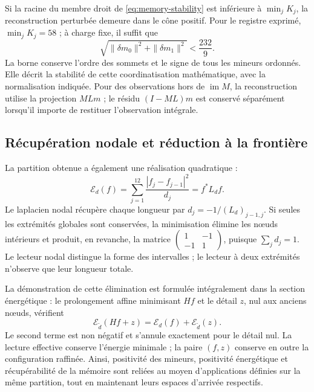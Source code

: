 Si la racine du membre droit de \eqref{eq:memory-stability} est inférieure à \(\min_j K_j\), la reconstruction perturbée demeure dans le cône positif. Pour le registre exprimé, \(\min_jK_j=58\) ; à charge fixe, il suffit que
\[
 \sqrt{\|\delta m_0\|^2+\|\delta m_1\|^2}<\frac{232}{9}.
\]
La borne conserve l'ordre des sommets et le signe de tous les mineurs ordonnés. Elle décrit la stabilité de cette coordinatisation mathématique, avec la normalisation indiquée. Pour des observations hors de \(\operatorname{im}M\), la reconstruction utilise la projection \(MLm\) ; le résidu \((I-ML)m\) est conservé séparément lorsqu'il importe de restituer l'observation intégrale.

\subsection{Récupération nodale et réduction à la frontière}

La partition obtenue a également une réalisation quadratique :
\[
 \mathcal E_d(f)=\sum_{j=1}^{12}\frac{|f_j-f_{j-1}|^2}{d_j}
 =f^*L_df.
\]
Le laplacien nodal récupère chaque longueur par \(d_j=-1/(L_d)_{j-1,j}\). Si seules les extrémités globales sont conservées, la minimisation élimine les nœuds intérieurs et produit, en revanche, la matrice \(\left(\begin{smallmatrix}1&-1\\-1&1\end{smallmatrix}\right)\),
puisque \(\sum_jd_j=1\). Le lecteur nodal distingue la forme des intervalles ;
le lecteur à deux extrémités n’observe que leur longueur totale.

La démonstration de cette élimination est formulée intégralement dans la section
énergétique : le prolongement affine minimisant \(Hf\) et le détail \(z\),
nul aux anciens nœuds, vérifient
\[
 \mathcal E_{\widetilde d}(Hf+z)
 =\mathcal E_d(f)+\mathcal E_{\widetilde d}(z).
\]
Le second terme est non négatif et s'annule exactement pour le détail nul. La lecture effective conserve l'énergie minimale ; la paire \((f,z)\) conserve en outre la configuration raffinée. Ainsi, positivité des mineurs, positivité énergétique et récupérabilité de la mémoire sont reliées au moyen d'applications définies sur la même partition, tout en maintenant leurs espaces d'arrivée respectifs.
